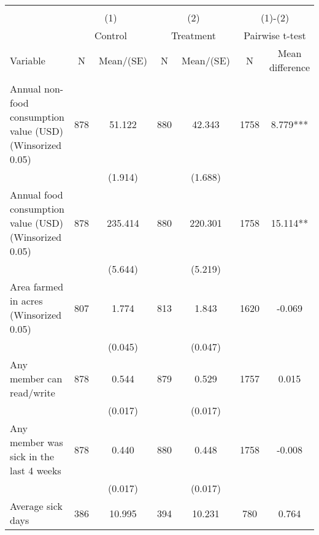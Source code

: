 
\begin{tabular}{@{\extracolsep{5pt}}lcccccc}
\\[-1.8ex]\hline \hline \\[-1.8ex]
 & \multicolumn{2}{c}{(1)}  & \multicolumn{2}{c}{(2)}  & \multicolumn{2}{c}{(1)-(2)} \\
 & \multicolumn{2}{c}{Control}  & \multicolumn{2}{c}{Treatment}  & \multicolumn{2}{c}{Pairwise t-test}  \\
Variable & N & Mean/(SE) & N & Mean/(SE) & N & Mean difference \\ \hline \\[-1.8ex] 
Annual non-food consumption value (USD) (Winsorized 0.05)   & 878    & 51.122    & 880    & 42.343    & 1758    & 8.779***   \\
 &   & (1.914)  &   & (1.688)  &   &  \\ [1ex]
Annual food consumption value (USD) (Winsorized 0.05)   & 878    & 235.414    & 880    & 220.301    & 1758    & 15.114**   \\
 &   & (5.644)  &   & (5.219)  &   &  \\ [1ex]
Area farmed in acres (Winsorized 0.05)   & 807    & 1.774    & 813    & 1.843    & 1620    & -0.069   \\
 &   & (0.045)  &   & (0.047)  &   &  \\ [1ex]
Any member can read/write   & 878    & 0.544    & 879    & 0.529    & 1757    & 0.015   \\
 &   & (0.017)  &   & (0.017)  &   &  \\ [1ex]
Any member was sick in the last 4 weeks   & 878    & 0.440    & 880    & 0.448    & 1758    & -0.008   \\
 &   & (0.017)  &   & (0.017)  &   &  \\ [1ex]
Average sick days   & 386    & 10.995    & 394    & 10.231    & 780    & 0.764   \\

\end{tabular}
